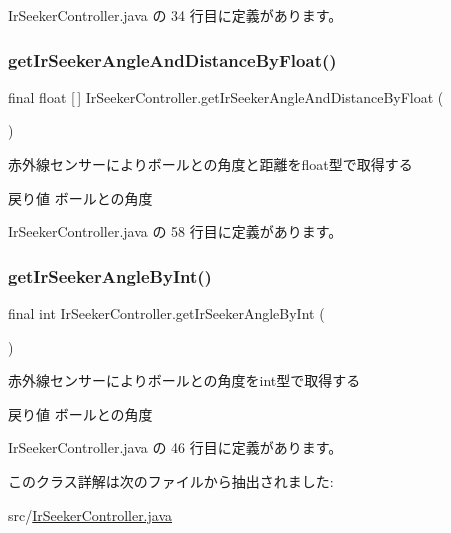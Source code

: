  Ir\+Seeker\+Controller.\+java の 34 行目に定義があります。

\mbox{\label{class_ir_seeker_controller_a554c0174b99e64201156d05434781bb3}} 
\subsubsection{\texorpdfstring{getIrSeekerAngleAndDistanceByFloat()}{getIrSeekerAngleAndDistanceByFloat()}}
{\footnotesize\ttfamily final float \mbox{[}$\,$\mbox{]} Ir\+Seeker\+Controller.\+get\+Ir\+Seeker\+Angle\+And\+Distance\+By\+Float (\begin{DoxyParamCaption}{ }\end{DoxyParamCaption})\hspace{0.3cm}{\ttfamily [inline]}}

赤外線センサーによりボールとの角度と距離をfloat型で取得する \begin{DoxyReturn}{戻り値}
ボールとの角度 
\end{DoxyReturn}


 Ir\+Seeker\+Controller.\+java の 58 行目に定義があります。

\mbox{\label{class_ir_seeker_controller_ae8eeef8c000dbea552f843f8b97630e7}} 
\subsubsection{\texorpdfstring{getIrSeekerAngleByInt()}{getIrSeekerAngleByInt()}}
{\footnotesize\ttfamily final int Ir\+Seeker\+Controller.\+get\+Ir\+Seeker\+Angle\+By\+Int (\begin{DoxyParamCaption}{ }\end{DoxyParamCaption})\hspace{0.3cm}{\ttfamily [inline]}}

赤外線センサーによりボールとの角度をint型で取得する \begin{DoxyReturn}{戻り値}
ボールとの角度 
\end{DoxyReturn}


 Ir\+Seeker\+Controller.\+java の 46 行目に定義があります。



このクラス詳解は次のファイルから抽出されました\+:\begin{DoxyCompactItemize}
\item 
src/\mbox{\hyperlink{_ir_seeker_controller_8java}{Ir\+Seeker\+Controller.\+java}}\end{DoxyCompactItemize}

